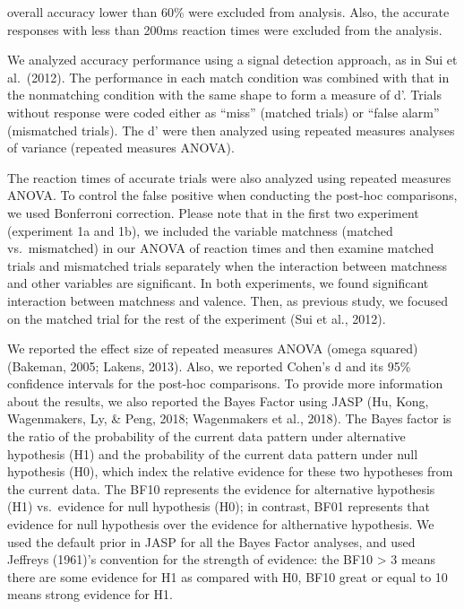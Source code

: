 \documentclass[man]{apa6}
\begin{document}
overall accuracy lower than 60\% were excluded from analysis. Also, the accurate responses with less than 200ms reaction times were excluded from the analysis.

We analyzed accuracy performance using a signal detection approach, as in Sui et al.~(2012). The performance in each match condition was combined with that in the nonmatching condition with the same shape to form a measure of d'. Trials without response were coded either as \enquote{miss} (matched trials) or \enquote{false alarm} (mismatched trials). The d' were then analyzed using repeated measures analyses of variance (repeated measures ANOVA).

The reaction times of accurate trials were also analyzed using repeated measures ANOVA. To control the false positive when conducting the post-hoc comparisons, we used Bonferroni correction. Please note that in the first two experiment (experiment 1a and 1b), we included the variable matchness (matched vs.~mismatched) in our ANOVA of reaction times and then examine matched trials and mismatched trials separately when the interaction between matchness and other variables are significant. In both experiments, we found significant interaction between matchness and valence. Then, as previous study, we focused on the matched trial for the rest of the experiment (Sui et al., 2012).

We reported the effect size of repeated measures ANOVA (omega squared) (Bakeman, 2005; Lakens, 2013). Also, we reported Cohen's d and its 95\% confidence intervals for the post-hoc comparisons. To provide more information about the results, we also reported the Bayes Factor using JASP (Hu, Kong, Wagenmakers, Ly, \& Peng, 2018; Wagenmakers et al., 2018). The Bayes factor is the ratio of the probability of the current data pattern under alternative hypothesis (H1) and the probability of the current data pattern under null hypothesis (H0), which index the relative evidence for these two hypotheses from the current data. The BF10 represents the evidence for alternative hypothesis (H1) vs.~evidence for null hypothesis (H0); in contrast, BF01 represents that evidence for null hypothesis over the evidence for althernative hypothesis. We used the default prior in JASP for all the Bayes Factor analyses, and used Jeffreys (1961)'s convention for the strength of evidence: the BF10 \textgreater{} 3 means there are some evidence for H1 as compared with H0, BF10 great or equal to 10 means strong evidence for H1.
\end{document}
